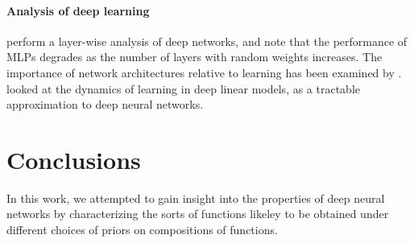 \paragraph{Analysis of deep learning}
\cite{montavon2010layer} perform a layer-wise analysis of deep networks, and note that the performance of MLPs degrades as the number of layers with random weights increases.
The importance of network architectures relative to learning has been examined by \cite{saxe2011random}.
\cite{saxedynamics} looked at the dynamics of learning in deep linear models, as a tractable approximation to deep neural networks.  











\section{Conclusions}


In this work, we attempted to gain insight into the properties of deep neural networks by characterizing the sorts of functions likeley to be obtained under different choices of priors on compositions of functions.

